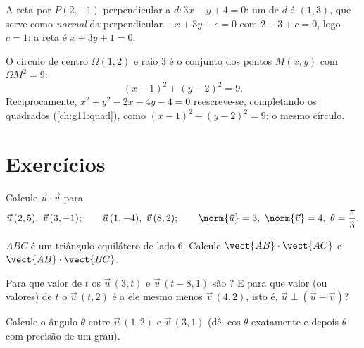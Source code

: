 \begin{example}\label{ex:g11:scal:perpline}
A reta por $P(2, -1)$ perpendicular a $d : 3x - y + 4 = 0$: um  de $d$ é $(1, 3)$, que serve como  \emph{normal} da
perpendicular. : $x + 3y + c = 0$ com $2 - 3 + c = 0$, logo
$c = 1$: a reta é $x + 3y + 1 = 0$.
\end{example}

\begin{example}\label{ex:g11:scal:circle}
O círculo de centro $\Omega(1, 2)$ e raio $3$ é o conjunto dos pontos
$M(x,y)$ com $\Omega M^2 = 9$:
\[
(x - 1)^2 + (y - 2)^2 = 9 .
\]
Reciprocamente, $x^2 + y^2 - 2x - 4y - 4 = 0$ reescreve-se, completando
os quadrados (\cref{ch:g11:quad}), como $(x-1)^2 + (y-2)^2 = 9$: o mesmo
círculo.
\end{example}

\section{Exercícios}

\begin{exercise}[$\star$]\label{exo:g11:scal:1}
Calcule $\vec u \cdot \vec v$ para
\[
\vec u\,(2, 5),\ \vec v\,(3, -1); \qquad
\vec u\,(1, -4),\ \vec v\,(8, 2); \qquad
\norm{\vec u} = 3,\ \norm{\vec v} = 4,\ \theta = \frac{\pi}{3} .
\]
\end{exercise}

\begin{exercise}[$\star$]\label{exo:g11:scal:2}
$ABC$ é um triângulo equilátero de lado $6$. Calcule
$\vect{AB} \cdot \vect{AC}$ e $\vect{AB} \cdot \vect{BC}$.
\end{exercise}

\begin{exercise}[$\star$]\label{exo:g11:scal:3}
Para que valor de $t$ os  $\vec u\,(3, t)$ e $\vec v\,(t - 8, 1)$
são ? E para que valor (ou valores) de $t$ o 
$\vec u\,(t, 2)$ é  a ele mesmo menos $\vec v\,(4, 2)$, isto é,
$\vec u \perp (\vec u - \vec v)$?
\end{exercise}

\begin{exercise}[$\star$]\label{exo:g11:scal:4}
Calcule o ângulo $\theta$ entre $\vec u\,(1, 2)$ e $\vec v\,(3, 1)$ (dê
$\cos\theta$ exatamente e depois $\theta$ com precisão de um grau).
\end{exercise}

